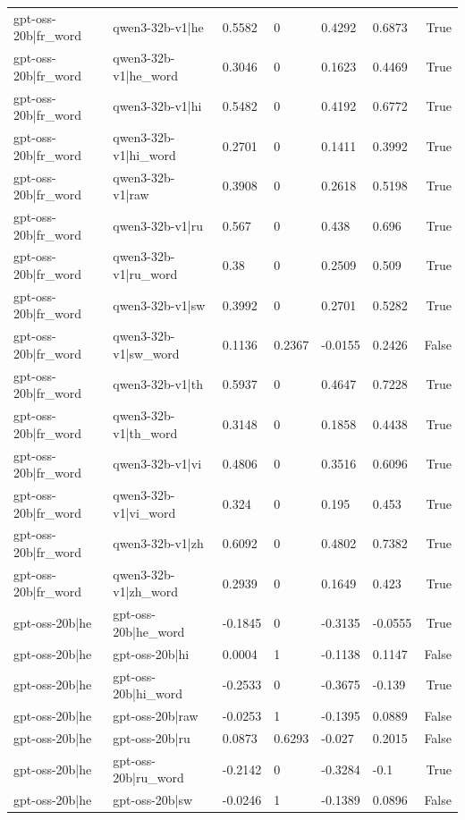 \begin{table}
\begin{tabular}{llllllr}
gpt-oss-20b|fr_word & qwen3-32b-v1|he & 0.5582 & 0 & 0.4292 & 0.6873 & True \\
gpt-oss-20b|fr_word & qwen3-32b-v1|he_word & 0.3046 & 0 & 0.1623 & 0.4469 & True \\
gpt-oss-20b|fr_word & qwen3-32b-v1|hi & 0.5482 & 0 & 0.4192 & 0.6772 & True \\
gpt-oss-20b|fr_word & qwen3-32b-v1|hi_word & 0.2701 & 0 & 0.1411 & 0.3992 & True \\
gpt-oss-20b|fr_word & qwen3-32b-v1|raw & 0.3908 & 0 & 0.2618 & 0.5198 & True \\
gpt-oss-20b|fr_word & qwen3-32b-v1|ru & 0.567 & 0 & 0.438 & 0.696 & True \\
gpt-oss-20b|fr_word & qwen3-32b-v1|ru_word & 0.38 & 0 & 0.2509 & 0.509 & True \\
gpt-oss-20b|fr_word & qwen3-32b-v1|sw & 0.3992 & 0 & 0.2701 & 0.5282 & True \\
gpt-oss-20b|fr_word & qwen3-32b-v1|sw_word & 0.1136 & 0.2367 & -0.0155 & 0.2426 & False \\
gpt-oss-20b|fr_word & qwen3-32b-v1|th & 0.5937 & 0 & 0.4647 & 0.7228 & True \\
gpt-oss-20b|fr_word & qwen3-32b-v1|th_word & 0.3148 & 0 & 0.1858 & 0.4438 & True \\
gpt-oss-20b|fr_word & qwen3-32b-v1|vi & 0.4806 & 0 & 0.3516 & 0.6096 & True \\
gpt-oss-20b|fr_word & qwen3-32b-v1|vi_word & 0.324 & 0 & 0.195 & 0.453 & True \\
gpt-oss-20b|fr_word & qwen3-32b-v1|zh & 0.6092 & 0 & 0.4802 & 0.7382 & True \\
gpt-oss-20b|fr_word & qwen3-32b-v1|zh_word & 0.2939 & 0 & 0.1649 & 0.423 & True \\
gpt-oss-20b|he & gpt-oss-20b|he_word & -0.1845 & 0 & -0.3135 & -0.0555 & True \\
gpt-oss-20b|he & gpt-oss-20b|hi & 0.0004 & 1 & -0.1138 & 0.1147 & False \\
gpt-oss-20b|he & gpt-oss-20b|hi_word & -0.2533 & 0 & -0.3675 & -0.139 & True \\
gpt-oss-20b|he & gpt-oss-20b|raw & -0.0253 & 1 & -0.1395 & 0.0889 & False \\
gpt-oss-20b|he & gpt-oss-20b|ru & 0.0873 & 0.6293 & -0.027 & 0.2015 & False \\
gpt-oss-20b|he & gpt-oss-20b|ru_word & -0.2142 & 0 & -0.3284 & -0.1 & True \\
gpt-oss-20b|he & gpt-oss-20b|sw & -0.0246 & 1 & -0.1389 & 0.0896 & False \\

\end{tabular}
\end{table}
